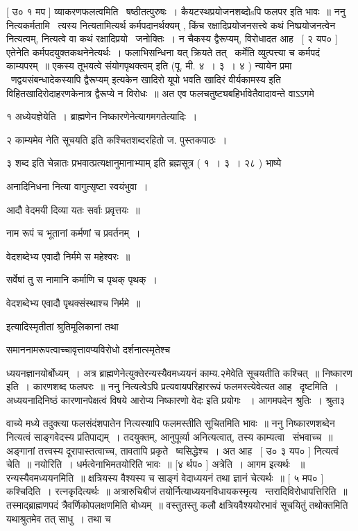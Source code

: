 \documentclass[11pt, openany]{book}
\begin{document}
 [ उ० १ मप ] व्याकरणफलत्वमिति \textendash\ षष्ठीतत्पुरुषः~। 
कैयटस्थप्रयोजनशब्दोsपि फलपर इति भावः~॥ ननु नित्यकर्मतामि \textendash\ त्यस्य
नित्यतामित्यर्थ कर्मपदानर्थक्यम् , किंच रक्षादिप्रयोजनसत्त्वे कथं
निष्प्रयोजनत्वेन नित्यत्वम्, नित्यत्वे वा कथं रक्षादिप्रयो \textendash\ जनोक्तिः~। न
चैकस्य द्वैरूप्यम्, विरोधादत आह \textendash\ [ २ यप० ] एतेनेति
कर्मपदयुक्तकथनेनेत्यर्थः~। फलाभिसन्धिना यत् क्रियते तत् \textendash\ कर्मेति
व्युत्पत्त्या च कर्मपदं काम्यपरम्~॥ {\qt एकस्य तूभयत्वे संयोगपृथक्त्वम्}
इति (पू. मी. ४~। ३~। ४ ) न्यायेन प्रमा \textendash\ णद्वयसंबन्धादेकस्यापि द्वैरूप्यम्
इत्यकेन {\qt खादिरो यूपो भवति खादिरं वीर्यकामस्य} इति
विहितखादिरोदाहरणकेनात्र द्वैरूप्ये न विरोधः~॥ अत एव
फलचतुष्ट्यबहिर्भावेतैवादावन्ते वाऽऽगमे 



१ अध्येयज्ञेयेति~। ब्राह्मणेन निष्कारणेनेत्यागमगतेत्यादिः~। 

२ काम्यमेव नेति सूचयति इति {\qt कश्चित}शब्दरहितो ज. पुस्तकपाठः~। 

३ {\qt शब्द इति चेन्नातः प्रभवात्प्रत्यक्षानुमानाभ्याम्} इति ब्रह्मसूत्र
( १~। ३~। २८ ) भाष्ये \textendash\ 

 अनादिनिधना नित्या वागुत्सृष्टा स्वयंभुवा~। 

आदौ वेदमयी दिव्या यतः सर्वाः प्रवृत्तयः~॥ 

नाम रूपं च भूतानां कर्मणां च प्रवर्तनम्~। 

वेदशब्देभ्य एवादौ निर्ममे स महेश्वरः~॥ 

सर्वेषां तु स नामानि कर्माणि च पृथक् पृथक्~। 

वेदशब्देभ्य एवादौ पृथक्संस्थाश्च निर्ममे~॥ 

इत्यादिस्मृतीतां श्रुतिमूलिकानां तथा \textendash\ 

{\qt समाननामरूपत्वाच्चावृत्तावप्यविरोधो} दर्शनात्स्मृतेश्च





ध्ययनज्ञानयोर्बोध्यम्~। अत्र ब्राह्मणेनेत्युक्तेरन्यस्यैवमध्ययनं
काम्य.२मेवेति सूचयतीति कश्चित्~॥ निष्कारण इति~। कारणशब्द फलपरः~॥ ननु
नित्यत्वेऽपि प्रत्यवायपरिहाररूपं फलमस्त्येवेत्यत आह \textendash\ दृष्टमिति~। 
अध्ययनादिनिष्ठं कारणानपेक्षत्वं विषये आरोप्य {\qt निष्कारणो वेदः इति प्रयोगः
~।} आगमपदेन श्रुतिः~। श्रुता३



वाच्ये मध्ये तदुक्त्या फलसंदंशपातेन नित्यस्यापि फलमस्तीति सूचितमिति
भावः~॥ ननु निष्कारणशब्देन नित्यत्वं साङ्गवेदस्य प्रतिपाद्यम्~। 
तदयुक्तम्, आनुपूर्व्या अनित्यत्वात्, तस्य काम्यत्वा \textendash\ संभवाच्च~॥
अङ्गानां तत्त्वस्य दूरापास्तत्वाच्च, तावतापि प्रकृते \textendash\ ष्वसिद्धेश्च~। अत
आह \textendash\ [ उ० ३ यप० ] नित्यत्वं चेति~॥ नयोरिति~। 
धर्मत्वेनाभिमतयोरिति भावः~॥ [४ र्थप० ] अत्रेति~। आगम इत्यर्थः
~॥ रन्यस्यैवमध्ययनमिति~॥ क्षत्रियस्य वैश्यस्य च साङ्गं वेदाध्ययनं
तथा ज्ञानं चेत्यर्थः~॥ [ ५ मप० ] कश्चिदिति~। रत्नकृदित्यर्थः~॥
अत्रारुचिबीजं तयोर्नित्याध्ययनविधायकस्मृत्य \textendash\ न्तरादिविरोधापत्तिरिति~॥
तस्माद्ब्राह्मणपदं त्रैवर्णिकोपलक्षणमिति बोध्यम्~॥ वस्तुतस्तु कलौ
क्षत्रियवैश्ययोरभावं सूचयितुं तथोक्तमिति यथाश्रुतमेव तत् साधु~। तथा च \textendash\ 
\end{document}
